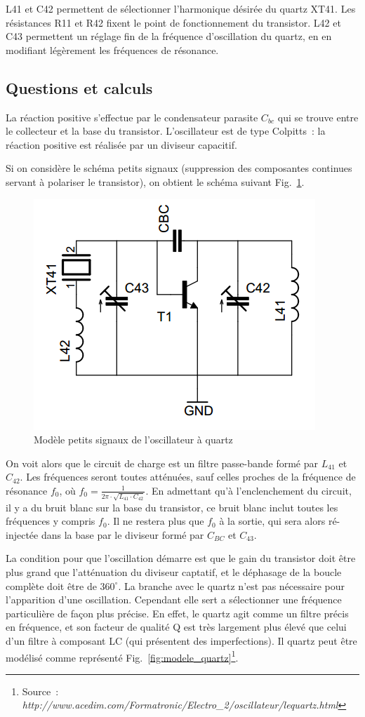 \documentclass{article}
\begin{document}
L41 et C42 permettent de sélectionner l'harmonique désirée du quartz XT41. Les résistances R11 et R42 fixent le point de fonctionnement du transistor. L42 et C43 permettent un réglage fin de la fréquence d'oscillation du quartz, en en modifiant légèrement les fréquences de résonance.



\subsection{Questions et calculs}


La réaction positive s'effectue par le condensateur parasite $C_{bc}$ qui se trouve entre le collecteur et la base du transistor.
L'oscillateur est de type Colpitts~: la réaction positive est réalisée par un diviseur capacitif.

Si on considère le schéma petits signaux (suppression des composantes continues servant à polariser le transistor), on obtient le schéma suivant Fig.~\ref{fig:osc_quartz_ac}.

\begin{figure}[h]
	\centering
	\includegraphics[width=0.4\linewidth]{shema_petit_signaux_oscillateur.png}
	\caption{Modèle petits signaux de l'oscillateur à quartz}
	\label{fig:osc_quartz_ac}
\end{figure}

On voit alors que le circuit de charge est un filtre passe-bande formé par $L_{41}$ et $C_{42}$. Les fréquences seront toutes atténuées, sauf celles proches de la fréquence de résonance $f_0$, où $f_0 = \frac{1}{2 \pi \cdot \sqrt{L_{41} \cdot C_{42}}}$.
En admettant qu'à l'enclenchement du circuit, il y a du bruit blanc sur la base du transistor, ce bruit blanc inclut toutes les fréquences y compris $f_0$. Il ne restera plus que $f_0$ à la sortie, qui sera alors ré-injectée dans la base par le diviseur formé par $C_{BC}$ et $C_{43}$.

La condition pour que l'oscillation démarre est que le gain du transistor doit être plus grand que l'atténuation du diviseur captatif, et le déphasage de la boucle complète doit être de $360^{ \circ }$. La branche avec le quartz n'est pas nécessaire pour l'apparition d'une oscillation. Cependant elle sert a sélectionner une fréquence particulière de façon plus précise. En effet, le quartz agit comme un filtre précis en fréquence, et son facteur de qualité Q est très largement plus élevé que celui d'un filtre à composant LC (qui présentent des imperfections). Il quartz peut être modélisé comme représenté Fig.~\ref{fig:modele_quartz}\footnote{Source~: \textit{http://www.acedim.com/Formatronic/Electro\_2/oscillateur/lequartz.html}}.
\end{document}
